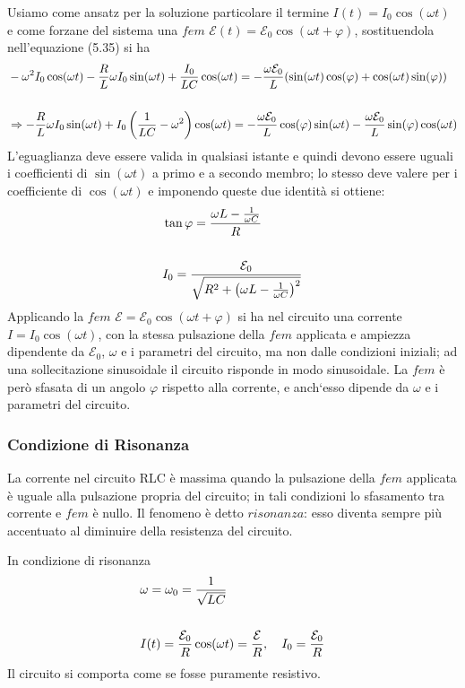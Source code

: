 Usiamo come ansatz per la soluzione particolare il termine $I(t) = I_0 \cos(\omega t)$ e come forzane del sistema una $fem$ $\mathcal{E}(t) = \mathcal{E}_0 \cos(\omega t + \varphi)$, sostituendola nell'equazione (5.35) si ha
\begin{align*}
	& - \omega^2 I_0 \cos(\omega t) - \frac{R}{L} \omega I_0 \sin(\omega t)+ \frac{I_0}{LC} \cos(\omega t) = - \frac{\omega \mathcal{E}_0}{L}(\sin(\omega t)\cos(\varphi) + \cos(\omega t)\sin(\varphi)) \\ \rule{0pt}{30pt}
	& \Rightarrow -\frac{R}{L}\omega I_0 \sin(\omega t) + I_0 \left(\frac{1}{LC} - \omega^2\right)\cos(\omega t) = - \frac{\omega \mathcal{E}_0}{L}\cos(\varphi)\sin(\omega t) - \frac{\omega \mathcal{E}_0}{L}\sin(\varphi)\cos(\omega t)
\end{align*}
L'eguaglianza deve essere valida in qualsiasi istante e quindi devono essere uguali i coefficienti di $\sin(\omega t)$ a primo e a secondo membro; lo stesso deve valere per i coefficiente di $\cos(\omega t)$ e imponendo queste due identit\`a si ottiene:
\begin{align}
	& \tan \varphi = \frac{\omega L - \frac{1}{\omega C}}{R} \\ \rule{0pt}{30pt}
	& I_0 = \frac{\mathcal{E}_0}{\sqrt{R^2 + \left(\omega L - \frac{1}{\omega C}\right)^2}}
\end{align}
Applicando la $fem$ $\mathcal{E} = \mathcal{E}_0 \cos(\omega t + \varphi)$ si ha nel circuito una corrente $I = I_0 \cos(\omega t)$, con la stessa pulsazione della $fem$ applicata e ampiezza dipendente da $\mathcal{E}_0$, $\omega$ e i parametri del circuito, ma non dalle condizioni iniziali; ad una sollecitazione sinusoidale il circuito risponde in modo sinusoidale. La $fem$ \`e per\`o sfasata di un angolo $\varphi$ rispetto alla corrente, e anch`esso dipende da $\omega$ e i parametri del circuito.

\subsubsection{Condizione di Risonanza}

La corrente nel circuito RLC \`e massima quando la pulsazione della $fem$ applicata \`e uguale alla pulsazione propria del circuito; in tali condizioni lo sfasamento tra corrente e $fem$ \`e nullo. Il fenomeno \`e detto $risonanza$: esso diventa sempre pi\`u accentuato al diminuire della resistenza del circuito.

In condizione di risonanza 
\begin{align}
	& \omega = \omega_0 = \frac{1}{\sqrt{LC}} \\ \rule{0pt}{30pt}
	& I(t) = \frac{\mathcal{E}_0}{R} \cos(\omega t) = \frac{\mathcal{E}}{R}, \quad I_0 = \frac{\mathcal{E}_0}{R}
\end{align}
Il circuito si comporta come se fosse puramente resistivo. 

